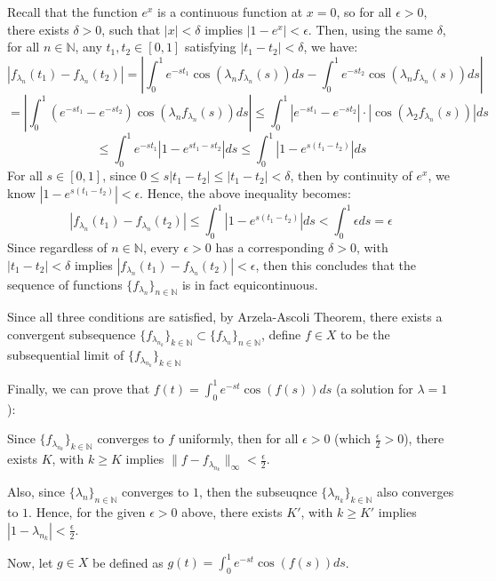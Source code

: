 \documentclass{article}
\begin{document}
Recall that the function $e^{x}$ is a continuous function at $x=0$, so for all $\epsilon>0$, there exists $\delta>0$, such that $|x|<\delta$ implies $|1-e^x|<\epsilon$.
Then, using the same $\delta$, for all $n\in\mathbb{N}$, any $t_1,t_2\in [0,1]$ satisfying $|t_1-t_2|<\delta$, we have:
$$|f_{\lambda_n}(t_1)-f_{\lambda_n}(t_2)| = \left|\int_{0}^{1}e^{-st_1}\cos(\lambda_n f_{\lambda_n}(s))ds-\int_{0}^{1}e^{-st_2}\cos(\lambda_n f_{\lambda_n}(s))ds\right|$$
$$ = \left|\int_{0}^{1}(e^{-st_1}-e^{-st_2})\cos(\lambda_n f_{\lambda_n}(s))ds\right| \leq \int_{0}^{1}|e^{-st_1}-e^{-st_2}|\cdot|\cos(\lambda_2 f_{\lambda_n}(s))|ds$$
$$\leq \int_{0}^{1}e^{-st_1}|1-e^{st_1-st_2}|ds \leq \int_{0}^{1}|1-e^{s(t_1-t_2)}|ds$$
For all $s\in [0,1]$, since $0\leq s|t_1-t_2|\leq |t_1-t_2|<\delta$, then by continuity of $e^{x}$, we know $|1-e^{s(t_1-t_2)}| < \epsilon$.
Hence, the above inequality becomes:
$$|f_{\lambda_n}(t_1)-f_{\lambda_n}(t_2)| \leq \int_{0}^{1}|1-e^{s(t_1-t_2)}|ds < \int_{0}^{1}\epsilon ds = \epsilon$$
Since regardless of $n\in\mathbb{N}$, every $\epsilon>0$ has a corresponding $\delta>0$, with $|t_1-t_2|<\delta$ implies $|f_{\lambda_n}(t_1)-f_{\lambda_n}(t_2)|<\epsilon$,
then this concludes that the sequence of functions $\{f_{\lambda_n}\}_{n\in\mathbb{N}}$ is in fact equicontinuous.

Since all three conditions are satisfied, by Arzela-Ascoli Theorem, there exists a convergent subsequence $\{f_{\lambda_{n_k}}\}_{k\in\mathbb{N}}\subset \{f_{\lambda_n}\}_{n\in\mathbb{N}}$, define $f\in X$ to be the subsequential limit of $\{f_{\lambda_{n_k}}\}_{k\in\mathbb{N}}$

\hfil

Finally, we can prove that $f(t)=\int_{0}^{1}e^{-st}\cos(f(s))ds$ (a solution for $\lambda=1$):

Since $\{f_{\lambda_{n_k}}\}_{k\in\mathbb{N}}$ converges to $f$ uniformly, then for all $\epsilon>0$ (which $\frac{\epsilon}{2}>0$), there exists $K$, with $k\geq K$ implies $\|f-f_{\lambda_{n_k}}\|_\infty <\frac{\epsilon}{2}$.

Also, since $\{\lambda_n\}_{n\in\mathbb{N}}$ converges to $1$, then the subseuqnce $\{\lambda_{n_k}\}_{k\in\mathbb{N}}$ also converges to $1$. Hence, for the given $\epsilon>0$ above, there exists $K'$,
with $k\geq K'$ implies $|1-\lambda_{n_k}|<\frac{\epsilon}{2}$.

Now, let $g\in X$ be defined as $g(t)=\int_{0}^{1}e^{-st}\cos(f(s))ds$. 
\end{document}
